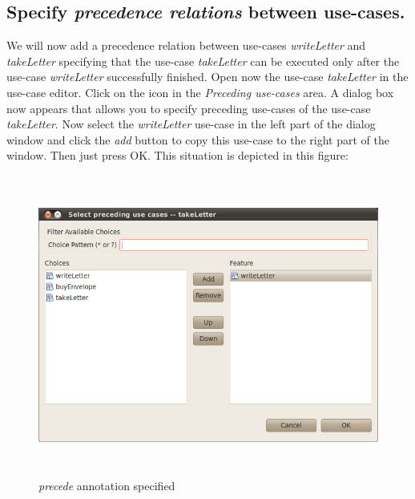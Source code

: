 \newpage

\subsection{Specify \emph{precedence relations} between use-cases.}

We will now add a precedence relation between use-cases \emph{writeLetter} and \emph{takeLetter} specifying that the use-case
\emph{takeLetter} can be executed only after the use-case \emph{writeLetter} successfully finished. Open now the use-case
\emph{takeLetter} in the use-case editor. Click on the icon in the \emph{Preceding use-cases} area. A dialog box now appears that
allows you to specify preceding use-cases of the use-case \emph{takeLetter}. Now select the \emph{writeLetter} use-case in the left part
of the dialog window and click the \emph{add} button to copy this use-case to the right part of the window. Then just press OK. This
situation is depicted in this figure:

\begin{figure}[ht]
  \centering
  \includegraphics[height=280pt]{images/reprotoolPrecede}
  \caption{\emph{precede} annotation specified}
  \label{fig:reprotoolPrecede}
\end{figure}